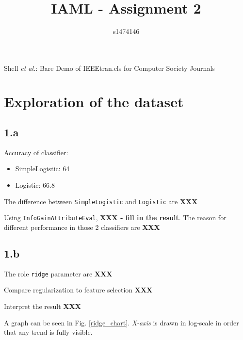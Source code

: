 \documentclass[12pt,journal,compsoc]{IEEEtran}
\begin{document}
%
\title{IAML - Assignment 2}
\author{s1474146}

%
{Shell \MakeLowercase{\textit{et al.}}: Bare Demo of IEEEtran.cls for Computer Society Journals}

\maketitle


\section{Exploration of the dataset}

\subsection*{1.a}
Accuracy of classifier:
\begin{itemize}
\item SimpleLogistic: 64%
\item Logistic: 66.8%
\end{itemize}

The difference between \texttt{SimpleLogistic} and \texttt{Logistic} are \textbf{XXX}

Using \texttt{InfoGainAttributeEval}, \textbf{XXX - fill in the result}. The reason for different performance in those 2 classifiers are \textbf{XXX}


\subsection*{1.b}
The role \texttt{ridge} parameter are \textbf{XXX}

Compare regularization to feature selection \textbf{XXX}

Interpret the result \textbf{XXX}

A graph can be seen in Fig. \ref{ridge_chart}. \textit{X-axis} is drawn in log-scale in order that any trend is fully visible.
\end{document}
